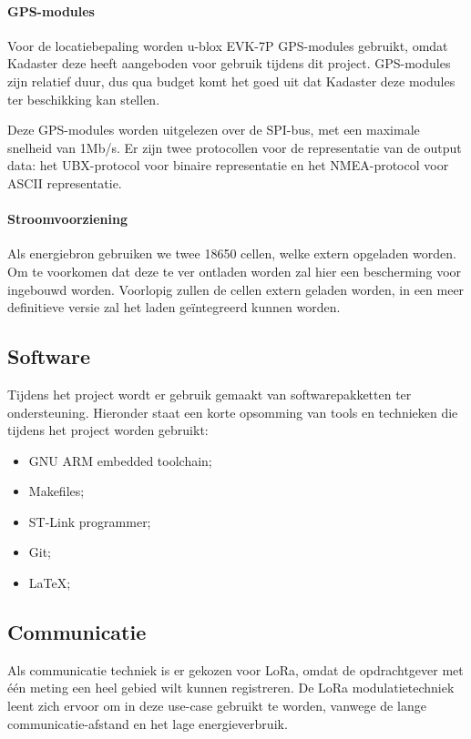 \paragraph{GPS-modules}
Voor de locatiebepaling worden u-blox EVK-7P GPS-modules gebruikt, omdat Kadaster deze heeft aangeboden voor gebruik tijdens dit project. GPS-modules zijn relatief duur, dus qua budget komt het goed uit dat Kadaster deze modules ter beschikking kan stellen.

Deze GPS-modules worden uitgelezen over de SPI-bus, met een maximale snelheid van 1Mb/s. Er zijn twee protocollen voor de representatie van de output data: het UBX-protocol voor binaire representatie en het NMEA-protocol voor ASCII representatie.

\paragraph{Stroomvoorziening}
Als energiebron gebruiken we twee 18650 cellen, welke extern opgeladen worden.
Om te voorkomen dat deze te ver ontladen worden zal hier een bescherming voor
ingebouwd worden. Voorlopig zullen de cellen extern geladen worden, in een meer
definitieve versie zal het laden geïntegreerd kunnen worden.

\subsection{Software}
Tijdens het project wordt er gebruik gemaakt van softwarepakketten ter ondersteuning. Hieronder staat een korte opsomming van tools en technieken die tijdens het project worden gebruikt:
\begin{itemize}
    \item GNU ARM embedded toolchain;
    \item Makefiles;
    \item ST-Link programmer;
    \item Git;
    \item \LaTeX;
\end{itemize}

\subsection{Communicatie}
Als communicatie techniek is er gekozen voor LoRa, omdat de opdrachtgever met één meting een heel gebied wilt kunnen registreren. De LoRa modulatietechniek leent zich ervoor om in deze use-case gebruikt te worden, vanwege de lange communicatie-afstand en het lage energieverbruik.

